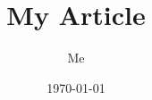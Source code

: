 \documentclass{article}
\begin{document}
\title{My Article}
\author{Me}
\date{1970-01-01}
\maketitle

\cite{key}

\printbibliography
\end{document}
